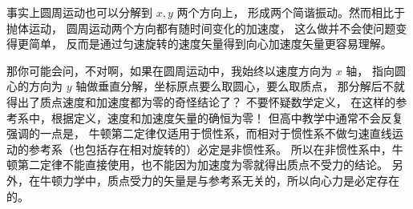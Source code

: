 事实上圆周运动也可以分解到 $x,y$ 两个方向上， 形成两个简谐振动。然而相比于抛体运动， 圆周运动两个方向都有随时间变化的加速度， 这么做并不会使问题变得更简单， 反而是通过匀速旋转的速度矢量得到向心加速度矢量更容易理解。

那你可能会问，不对啊，如果在圆周运动中，我始终以速度方向为 $x$ 轴， 指向圆心的方向为 $y$ 轴做垂直分解，坐标原点要么取圆心，要么取质点， 那分解后不就得出了质点速度和加速度都为零的奇怪结论了？ 不要怀疑数学定义， 在这样的参考系中，根据定义，速度和加速度矢量的确恒为零！ 但高中教学中通常不会反复强调的一点是， 牛顿第二定律仅适用于惯性系，而相对于惯性系不做匀速直线运动的参考系（也包括存在相对旋转的）必定是非惯性系。 所以在非惯性系中，牛顿第二定律不能直接使用，也不能因为加速度为零就得出质点不受力的结论。 另外，在牛顿力学中，质点受力的矢量是与参考系无关的，所以向心力是必定存在的。
